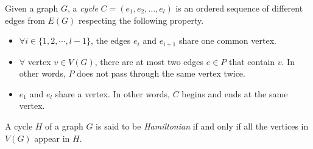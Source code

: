 \begin{definition}[Cycle]
    \label{def:cycle}
    Given a graph $G$, a \textit{cycle} $C = (e_1, e_2, \dots, e_l)$ is an ordered sequence of different edges from $E(G)$ respecting the following property.
    \begin{itemize}
        \item $\forall i \in \{1, 2, \cdots, l - 1\}$, the edges $e_i$ and $e_{i+1}$ share one common vertex.
        \item $\forall$ vertex $v \in V(G)$, there are at most two edges $e \in P$ that contain $v$.
            In other words, $P$ does not pass through the same vertex twice.
        \item $e_1$ and $e_l$ share a vertex.
            In other words, $C$ begins and ends at the same vertex.
    \end{itemize}
\end{definition}

\begin{definition}
    \label{def:hamiltonian_cycle}
    A cycle $H$ of a graph $G$ is said to be \textit{Hamiltonian} if and only if all the vertices in $V(G)$ appear in $H$.
\end{definition}

